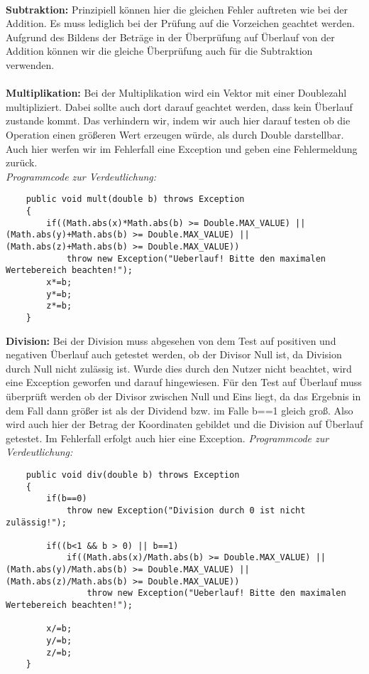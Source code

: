 \documentclass[a4paper,11pt]{scrartcl}
\begin{document}
\\
\textbf{Subtraktion:} Prinzipiell können hier die gleichen Fehler auftreten wie bei der Addition. Es muss lediglich bei der Prüfung auf die Vorzeichen geachtet werden. Aufgrund des Bildens der Beträge in der Überprüfung auf Überlauf von der Addition können wir die gleiche Überprüfung auch für die Subtraktion verwenden.\\
\\
\textbf{Multiplikation:} Bei der Multiplikation wird ein Vektor mit einer Doublezahl multipliziert. Dabei sollte auch dort darauf geachtet werden, dass kein Überlauf zustande kommt. Das verhindern wir, indem wir auch hier darauf testen ob die Operation einen größeren Wert erzeugen würde, als durch Double darstellbar. Auch hier werfen wir im Fehlerfall eine Exception und geben eine Fehlermeldung zurück.\\
\textit{Programmcode zur Verdeutlichung:}
\begin{lstlisting}
	public void mult(double b) throws Exception
	{
		if((Math.abs(x)*Math.abs(b) >= Double.MAX_VALUE) || (Math.abs(y)+Math.abs(b) >= Double.MAX_VALUE) || (Math.abs(z)+Math.abs(b) >= Double.MAX_VALUE))
			throw new Exception("Ueberlauf! Bitte den maximalen Wertebereich beachten!");
		x*=b;
		y*=b;
		z*=b;
	}
\end{lstlisting} $\;$ \\
\textbf{Division:} Bei der Division muss abgesehen von dem Test auf positiven und negativen Überlauf auch getestet werden, ob der Divisor Null ist, da Division durch Null nicht zulässig ist. Wurde dies durch den Nutzer nicht beachtet, wird eine Exception geworfen und darauf hingewiesen.
Für den Test auf Überlauf muss überprüft werden ob der Divisor zwischen Null und Eins liegt, da das Ergebnis in dem Fall dann größer ist als der Dividend bzw. im Falle b==1 gleich groß. Also wird auch hier der Betrag der Koordinaten gebildet und die Division auf Überlauf getestet. Im Fehlerfall erfolgt auch hier eine Exception.
\textit{Programmcode zur Verdeutlichung:}
\begin{lstlisting}
	public void div(double b) throws Exception
	{
		if(b==0)
			throw new Exception("Division durch 0 ist nicht zulässig!");
		
		if((b<1 && b > 0) || b==1)
			if((Math.abs(x)/Math.abs(b) >= Double.MAX_VALUE) || (Math.abs(y)/Math.abs(b) >= Double.MAX_VALUE) || (Math.abs(z)/Math.abs(b) >= Double.MAX_VALUE))
				throw new Exception("Ueberlauf! Bitte den maximalen Wertebereich beachten!");
		
		x/=b;
		y/=b;
		z/=b;
	}
\end{lstlisting} $\;$ \\
\end{document}
